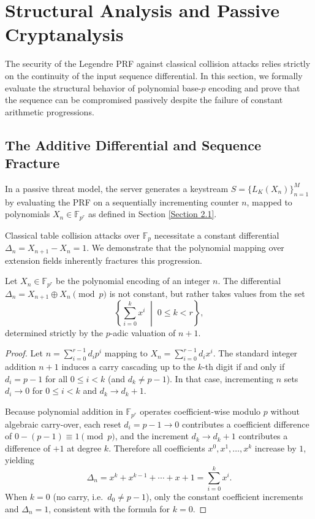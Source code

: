 \documentclass[runningheads]{llncs}
\begin{document}
\section{Structural Analysis and Passive Cryptanalysis} \label{Section 3}

The security of the Legendre PRF against classical collision attacks \cite{khovratovich2019} relies strictly on the continuity of the input sequence differential. In this section, we formally evaluate the structural behavior of polynomial base-$p$ encoding and prove that the sequence can be compromised passively despite the failure of constant arithmetic progressions.

\subsection{The Additive Differential and Sequence Fracture}
In a passive threat model, the server generates a keystream $S = \{ L_K(X_n) \}_{n=1}^M$ by evaluating the PRF on a sequentially incrementing counter $n$, mapped to polynomials $X_n \in \mathbb{F}_{p^r}$ as defined in Section \ref{Section 2.1}. 

Classical table collision attacks over $\mathbb{F}_p$ necessitate a constant differential $\Delta_n = X_{n+1} - X_n = 1$. We demonstrate that the polynomial mapping over extension fields inherently fractures this progression.

\begin{lemma} \label{lemma:carry}
Let $X_n \in \mathbb{F}_{p^r}$ be the polynomial encoding of an integer $n$. The differential $\Delta_n = X_{n+1} \oplus X_n \pmod p$ is not constant, but rather takes values from the set
\begin{equation*}
    \left\{ \sum_{i=0}^{k} x^i \;\middle|\; 0 \leq k < r \right\},
\end{equation*}
determined strictly by the $p$-adic valuation of $n+1$.
\end{lemma}

\begin{proof}
Let $n = \sum_{i=0}^{r-1} d_i p^i$ mapping to $X_n = \sum_{i=0}^{r-1} d_i x^i$. The standard integer addition $n + 1$ induces a carry cascading up to the $k$-th digit if and only if $d_i = p - 1$ for all $0 \leq i < k$ (and $d_k \neq p-1$). In that case, incrementing $n$ sets $d_i \to 0$ for $0 \leq i < k$ and $d_k \to d_k + 1$.

Because polynomial addition in $\mathbb{F}_{p^r}$ operates coefficient-wise modulo $p$ without algebraic carry-over, each reset $d_i = p - 1 \to 0$ contributes a coefficient difference of $0 - (p-1) \equiv 1 \pmod{p}$, and the increment $d_k \to d_k + 1$ contributes a difference of $+1$ at degree $k$. Therefore all coefficients $x^0, x^1, \ldots, x^k$ increase by $1$, yielding
\begin{equation*}
    \Delta_n = x^k + x^{k-1} + \cdots + x + 1 = \sum_{i=0}^{k} x^i.
\end{equation*}
When $k = 0$ (no carry, i.e.\ $d_0 \neq p-1$), only the constant coefficient increments and $\Delta_n = 1$, consistent with the formula for $k = 0$.
\end{proof}
\end{document}
